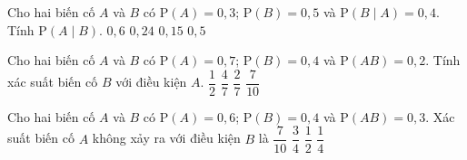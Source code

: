 \begin{ex}%
	Cho hai biến cố $A$ và $B$ có $\mathrm{P}\left(A\right) = 0{,}3$; $\mathrm{P}\left(B\right) = 0{,}5$ và
	$\mathrm{P}\left(B\mid A\right)=0{,}4$. Tính $\mathrm{P}\left(A\mid B\right)$. 
	\choice
	{$0{,}6$}
	{\True $0{,}24$}
	{$0{,}15$}
	{$0{,}5$}
\end{ex}
\begin{ex}%
	Cho hai biến cố $A$ và $B$ có $\mathrm{P}\left(A\right) = 0{,}7$; $\mathrm{P}\left(B\right) = 0{,}4$ và
	$\mathrm{P}\left(AB\right)=0{,}2$. Tính xác suất biến cố $B$ với điều kiện $A$. 
	\choice
	{$\dfrac{1}{2}$}
	{$\dfrac{4}{7}$}
	{\True $\dfrac{2}{7}$}
	{$\dfrac{7}{10}$}
\end{ex}
\begin{ex}%
	Cho hai biến cố $A$ và $B$ có $\mathrm{P}\left(A\right) = 0{,}6$; $\mathrm{P}\left(B\right) = 0{,}4$ và $\mathrm{P}\left(AB\right)=0{,}3$. Xác suất biến cố $A$ không xảy ra với điều kiện $B$ là 
	\choice
	{$\dfrac{7}{10}$}
	{$\dfrac{3}{4}$}
	{$\dfrac{1}{2}$}
	{\True $\dfrac{1}{4}$}
\end{ex}

